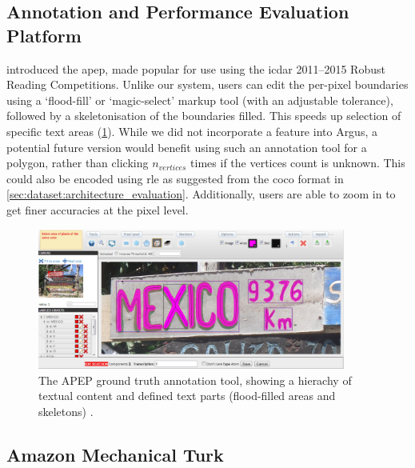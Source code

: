 \subsection{Annotation and Performance Evaluation Platform} 

\citet{Karatzas:2014bt} introduced the  \gls{apep}, made popular for use using the \gls{icdar} 2011--2015 Robust Reading Competitions. Unlike our system, users can edit the per-pixel boundaries using a `flood-fill' or `magic-select' markup tool (with an adjustable tolerance), followed by a skeletonisation of the boundaries filled. This speeds up selection of specific text areas (\cref{fig:dataset:architecture_evaluation:tools:apep}). While we did not incorporate a feature into Argus, a potential future version would benefit using such an annotation tool for a polygon, rather than clicking $n_{vertices}$ times if the vertices count is unknown. This could also be encoded using \gls{rle} as suggested from the \gls{coco} format in \cref{sec:dataset:architecture_evaluation}. Additionally, users are able to zoom in to get finer accuracies at the pixel level.


\begin{figure}[h]
  \centering
  \includegraphics[width=0.9\textwidth]{images/dataset/tools/apep}
  \caption[The APEP user interface]{The APEP ground truth annotation tool, showing a hierachy of textual content and defined text parts (flood-filled areas and skeletons) \cite{Karatzas:2014bt}.}
  \label{fig:dataset:architecture_evaluation:tools:apep}
\end{figure}


\vspace{-2em}
\subsection{Amazon Mechanical Turk}

